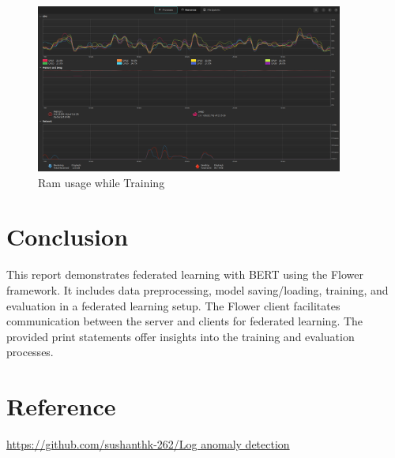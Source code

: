 \documentclass{article}
\begin{document}
\begin{figure}[h]
    \centering
    
    \vspace{\floatsep} %
    
    \includegraphics[width=0.9\textwidth]{ram.png}
    \caption{Ram usage while Training}
    \label{Ram usage while Training}
\end{figure}

\section{Conclusion}
This report demonstrates federated learning with BERT using the Flower framework. It includes data preprocessing, model saving/loading, training, and evaluation in a federated learning setup. The Flower client facilitates communication between the server and clients for federated learning. The provided print statements offer insights into the training and evaluation processes.

\section{Reference}
\href{https://github.com/sushanthk-262/Log anomaly detection}{https://github.com/sushanthk-262/Log anomaly detection}
\end{document}
